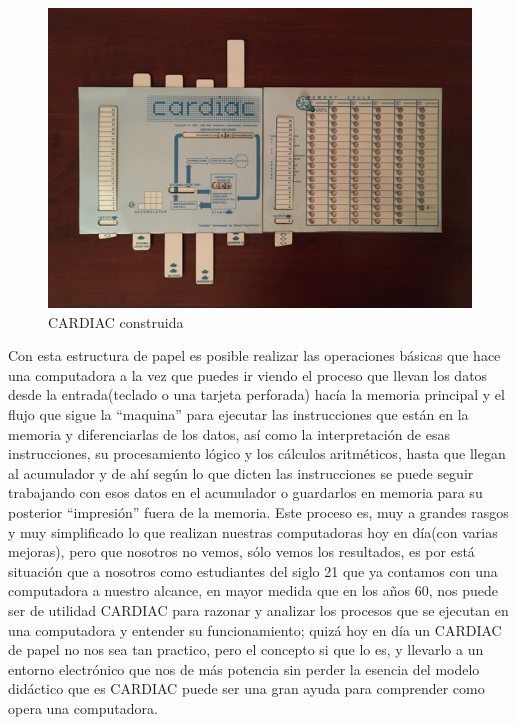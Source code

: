 \documentclass[letterpaper,12pt,oneside]{book}
\begin{document}
		\begin{figure}[h]
		\centering
			\includegraphics[scale=0.3]{media/CARDIAC_Paper/Construida.jpg}
			\caption{CARDIAC construida}
			\label{fig:CARDIAC_Construida}
		\end{figure}
		
		
		Con esta estructura de papel es posible realizar las operaciones básicas que hace una computadora a la vez que puedes ir viendo el proceso que llevan
		los datos desde la entrada(teclado o una tarjeta perforada) hacía la memoria principal y el flujo que sigue la ``maquina'' para ejecutar
		las instrucciones que están en la memoria y diferenciarlas de los datos, así como la interpretación de esas instrucciones, su procesamiento lógico y los
		cálculos aritméticos, hasta que llegan al acumulador y de ahí según lo que dicten las instrucciones se puede seguir trabajando con
		esos datos en el acumulador o guardarlos en memoria para su posterior ``impresión'' fuera de la memoria. Este proceso es, muy a grandes rasgos y muy simplificado
		lo que realizan nuestras computadoras hoy en día(con varias mejoras), pero que nosotros no vemos, sólo vemos los resultados, es por está situación que a nosotros
		como estudiantes del siglo 21 que ya contamos con una computadora a nuestro alcance, en mayor medida que en los años 60, nos puede ser de utilidad
		CARDIAC para razonar y analizar los procesos que se ejecutan en una computadora y entender su funcionamiento; quizá hoy en día un CARDIAC de papel
		no nos sea tan practico, pero el concepto si que lo es, y llevarlo a un entorno electrónico que nos de más potencia sin perder la esencia del modelo
		didáctico que es
		CARDIAC puede ser una gran ayuda para comprender como opera una computadora.
\end{document}
